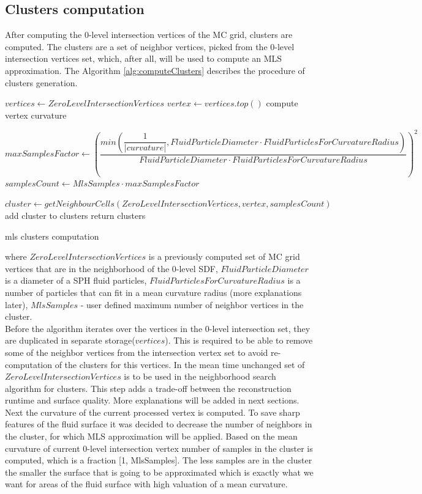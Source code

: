 \subsection{Clusters computation}
After computing the 0-level intersection vertices of the MC grid, clusters are computed. The clusters are a set of neighbor vertices, picked from the 0-level intersection vertices set, which, after all, will be used to compute an MLS approximation. The Algorithm \ref{alg:computeClusters} describes the procedure of clusters generation.
\begin{algorithm}[H]
	\scriptsize
	\begin{algorithmic}
			\State $vertices \gets ZeroLevelIntersectionVertices$
				\State $vertex \gets vertices.top()$
				\State compute vertex curvature

				\State $maxSamplesFactor \gets \left(\dfrac{min(\dfrac{1}{|curvature|}, FluidParticleDiameter \cdot FluidParticlesForCurvatureRadius)}{FluidParticleDiameter \cdot FluidParticlesForCurvatureRadius}\right)^2$
				\State $samplesCount \gets MlsSamples \cdot maxSamplesFactor$

				\State $cluster \gets getNeighbourCells(ZeroLevelIntersectionVertices, vertex, samplesCount)$
				\State add cluster to clusters
			\EndWhile
			\State return clusters
	\end{algorithmic}
	\caption{mls clusters computation}
	\label{alg:computeClusters}
\end{algorithm}
where $ZeroLevelIntersectionVertices$ is a previously computed set of MC grid vertices  that are in the neighborhood of the 0-level SDF,  
$FluidParticleDiameter$ is a diameter of a SPH fluid particles, $FluidParticlesForCurvatureRadius$ is a number of particles that can fit in a mean curvature radius (more explanations later), $MlsSamples$ - user defined maximum number of neighbor vertices in the cluster.\\
Before the algorithm iterates over the vertices in the 0-level intersection set, they are duplicated in separate storage($vertices$). This is required to be able to remove some of the neighbor vertices from the intersection vertex set to avoid re-computation of the clusters for this vertices. In the mean time unchanged set of $ZeroLevelIntersectionVertices$ is to be used in the neighborhood search algorithm for clusters. This step adds a trade-off between the reconstruction runtime and surface quality. More explanations will be added in next sections.\\
Next the curvature of the current processed vertex is computed. To save sharp features of the fluid surface it was decided to decrease the number of neighbors in the cluster, for which MLS approximation will be applied. Based on the mean curvature of current 0-level intersection vertex number of samples in the cluster is computed, which is a fraction [1, MlsSamples]. The less samples are in the cluster the smaller the surface that is going to be approximated which is exactly what we want for areas of the fluid surface with high valuation of a mean curvature.\\
